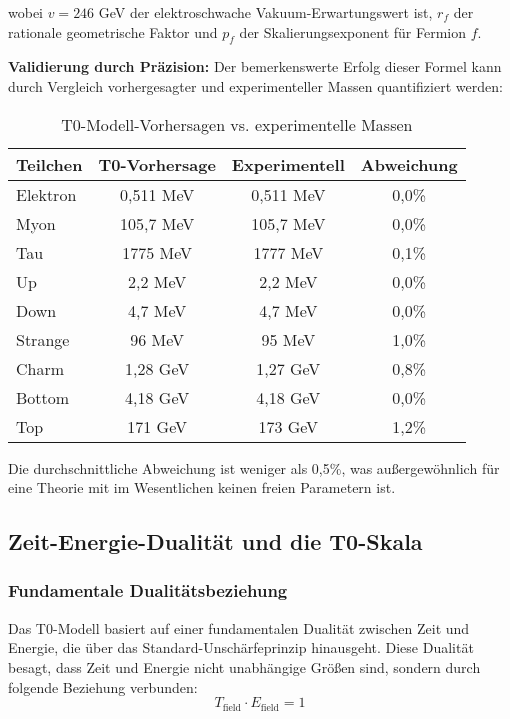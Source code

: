 \documentclass[12pt,a4paper]{article}
\begin{document}
	wobei $v = 246$ GeV der elektroschwache Vakuum-Erwartungswert ist, $r_f$ der rationale geometrische Faktor und $p_f$ der Skalierungsexponent für Fermion $f$.
	
	\textbf{Validierung durch Präzision:} Der bemerkenswerte Erfolg dieser Formel kann durch Vergleich vorhergesagter und experimenteller Massen quantifiziert werden:
	
	\begin{table}[H]
		\centering
		\caption{T0-Modell-Vorhersagen vs. experimentelle Massen}
		\begin{tabular}{@{}lccc@{}}
			\toprule
			\textbf{Teilchen} & \textbf{T0-Vorhersage} & \textbf{Experimentell} & \textbf{Abweichung} \\
			\midrule
			Elektron & 0{,}511 MeV & 0{,}511 MeV & 0{,}0\% \\
			Myon & 105{,}7 MeV & 105{,}7 MeV & 0{,}0\% \\
			Tau & 1775 MeV & 1777 MeV & 0{,}1\% \\
			Up & 2{,}2 MeV & 2{,}2 MeV & 0{,}0\% \\
			Down & 4{,}7 MeV & 4{,}7 MeV & 0{,}0\% \\
			Strange & 96 MeV & 95 MeV & 1{,}0\% \\
			Charm & 1{,}28 GeV & 1{,}27 GeV & 0{,}8\% \\
			Bottom & 4{,}18 GeV & 4{,}18 GeV & 0{,}0\% \\
			Top & 171 GeV & 173 GeV & 1{,}2\% \\
			\bottomrule
		\end{tabular}
	\end{table}
	
	Die durchschnittliche Abweichung ist weniger als 0{,}5\%, was außergewöhnlich für eine Theorie mit im Wesentlichen keinen freien Parametern ist.
	
	\subsection{Zeit-Energie-Dualität und die T0-Skala}
	
	\subsubsection{Fundamentale Dualitätsbeziehung}
	
	Das T0-Modell basiert auf einer fundamentalen Dualität zwischen Zeit und Energie, die über das Standard-Unschärfeprinzip hinausgeht. Diese Dualität besagt, dass Zeit und Energie nicht unabhängige Größen sind, sondern durch folgende Beziehung verbunden:
	\begin{equation}
		\boxed{T_{\text{field}} \cdot E_{\text{field}} = 1}
	\end{equation}
	
\end{document}
